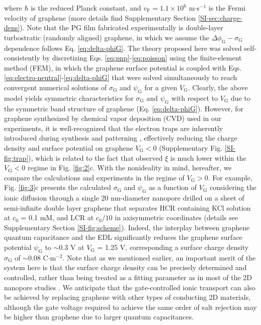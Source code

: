 \documentclass[journal=langd5,email=true, hyperref=true, keywords=false]{achemso}
\newcommand{\Fig}{Fig.}
\begin{document}
where $\hbar$ is the reduced Planck constant, and
$v_{\mathrm{F}}=1.1\times10^{6}$ m$\cdot$s$^{-1}$ is the Fermi
velocity of graphene (more details find Supplementary Section
\ref{SI-sec:charge-dens}).  Note that the PG film fabricated
experimentally is double-layer turbostratic (randomly aligned)
graphene, in which we assume the
$\Delta \phi_{\mathrm{G}} - \sigma_{\mathrm{G}}$ dependence follows
Eq. \eqref{eq:delta-phiG}. The theory proposed here was solved
self-consistently by discretizing
Eqs. \eqref{eq:pnp}-\eqref{eq:poisson} using the finite-element method
(FEM), in which the graphene surface potential is coupled with
Eqs. \eqref{eq:electro-neutral}-\eqref{eq:delta-phiG} that were solved
simultaneously to reach convergent numerical solutions of
$\sigma_{\mathrm{G}}$ and $\psi_{\mathrm{G}}$ for a given
$V_{\mathrm{G}}$. Clearly, the above model yields symmetric
characteristics for $\sigma_{\mathrm{G}}$ and $\psi_{\mathrm{G}}$ with
respect to $V_{\mathrm{G}}$ due to the symmetric band structure of
graphene (Eq. \eqref{eq:delta-phiG}). However, for graphene
synthesized by chemical vapor deposition (CVD) used in our
experiments, it is well-recognized that the electron traps are
inherently introduced during synthesis and patterning
\cite{Dean_2010}, effectively reducing the charge density and surface
potential on graphene $V_{\mathrm{G}}<0$ (Supplementary \Fig{}
\ref{SI-fig:trap}), which is related to the fact that observed $\xi$
is much lower within the $V_{\mathrm{G}}<0$ regime in \Fig{}
\ref{fig:2}c. With the nonideality in mind, hereafter, we compare the
calculations and experiments in the regime of $V_{\mathrm{G}}>0$. For
example, \Fig{} \ref{fig:3}c presents the calculated
$\sigma_{\mathrm{G}}$ and $\psi_{\mathrm{G}}$ as a function of
$V_{\mathrm{G}}$ considering the ionic diffusion through a single 20
nm-diameter nanopore drilled on a sheet of semi-infinite double layer
graphene that separates HCR containing KCl solution at $c_{0}$ = 0.1
mM, and LCR at $c_{0}/10$ in axisymmetric coordinates (details see
Supplementary Section \ref{SI-fig:scheme}). Indeed, the interplay
between graphene quantum capacitance and the EDL significantly reduces
the graphene surface potential $\psi_{\mathrm{G}}$ to $\sim$0.3 V at
$V_{\mathrm{G}}$ = 1.25 V, corresponding a surface charge density
$\sigma_{\mathrm{G}}$ of $\sim$0.08 C$\cdot$m$^{-2}$. Note that as we
mentioned earlier, an important merit of the system here is that the
surface charge density can be precisely determined and controlled,
rather than being treated as a fitting parameter as in most of the 2D
nanopore studies \cite{Rollings_2016}. We anticipate that the
gate-controlled ionic transport can also be achieved by replacing
graphene with other types of conducting 2D materials, although the
gate voltage required to achieve the same order of salt rejection may
be higher than graphene due to larger quantum capacitances.
\end{document}
